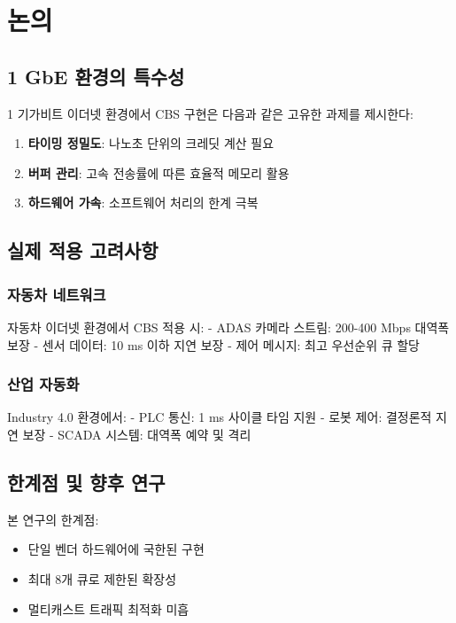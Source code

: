 \documentclass[12pt, a4paper]{article}
\begin{document}
\section{논의}

\subsection{1 GbE 환경의 특수성}

1 기가비트 이더넷 환경에서 CBS 구현은 다음과 같은 고유한 과제를 제시한다:

\begin{enumerate}
    \item \textbf{타이밍 정밀도}: 나노초 단위의 크레딧 계산 필요
    \item \textbf{버퍼 관리}: 고속 전송률에 따른 효율적 메모리 활용
    \item \textbf{하드웨어 가속}: 소프트웨어 처리의 한계 극복
\end{enumerate}

\subsection{실제 적용 고려사항}

\subsubsection{자동차 네트워크}

자동차 이더넷 환경에서 CBS 적용 시:
- ADAS 카메라 스트림: 200-400 Mbps 대역폭 보장
- 센서 데이터: 10 ms 이하 지연 보장
- 제어 메시지: 최고 우선순위 큐 할당

\subsubsection{산업 자동화}

Industry 4.0 환경에서:
- PLC 통신: 1 ms 사이클 타임 지원
- 로봇 제어: 결정론적 지연 보장
- SCADA 시스템: 대역폭 예약 및 격리

\subsection{한계점 및 향후 연구}

본 연구의 한계점:
\begin{itemize}
    \item 단일 벤더 하드웨어에 국한된 구현
    \item 최대 8개 큐로 제한된 확장성
    \item 멀티캐스트 트래픽 최적화 미흡
\end{itemize}
\end{document}
